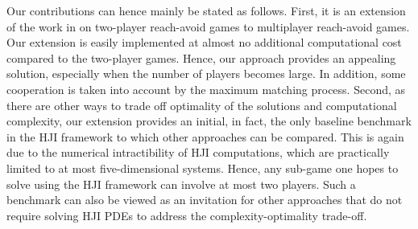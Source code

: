 Our contributions can hence mainly be stated as follows. First, it is an extension of the work in \cite{Huang2011} on two-player reach-avoid games to multiplayer reach-avoid games. Our extension is easily implemented at almost no additional computational cost compared to the two-player games. Hence, our approach provides an appealing solution, especially when the number of players becomes large. In addition, some cooperation is taken into account by the maximum matching process. Second, as there are other ways to trade off optimality of the solutions and computational complexity, our extension provides an initial, in fact, the only baseline benchmark in the HJI framework to which other approaches can be compared. This is again due to the numerical intractibility of HJI computations, which are practically limited to at most five-dimensional systems. Hence, any sub-game one hopes to solve using the HJI framework can involve at most two players. Such a benchmark can also be viewed as an invitation for other approaches that do not require solving HJI PDEs to address the complexity-optimality trade-off. 


